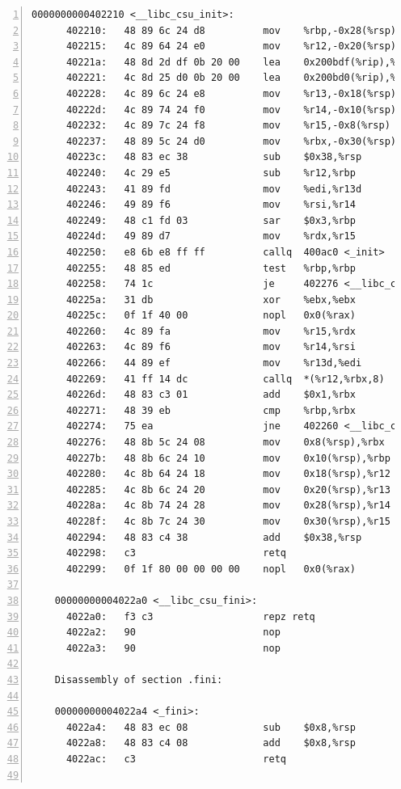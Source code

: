 \documentclass{article}
\begin{document}
\begin{lstlisting}[title = bomb的反汇编代码及部分注释, xleftmargin = 2em,xrightmargin = 2em, aboveskip = 1em, numbers = left, basicstyle=\scriptsize\ttfamily, numberstyle=\scriptsize]
    0000000000402210 <__libc_csu_init>:
      402210:	48 89 6c 24 d8       	mov    %rbp,-0x28(%rsp)
      402215:	4c 89 64 24 e0       	mov    %r12,-0x20(%rsp)
      40221a:	48 8d 2d df 0b 20 00 	lea    0x200bdf(%rip),%rbp        # 602e00 <__do_global_dtors_aux_fini_array_entry>
      402221:	4c 8d 25 d0 0b 20 00 	lea    0x200bd0(%rip),%r12        # 602df8 <__frame_dummy_init_array_entry>
      402228:	4c 89 6c 24 e8       	mov    %r13,-0x18(%rsp)
      40222d:	4c 89 74 24 f0       	mov    %r14,-0x10(%rsp)
      402232:	4c 89 7c 24 f8       	mov    %r15,-0x8(%rsp)
      402237:	48 89 5c 24 d0       	mov    %rbx,-0x30(%rsp)
      40223c:	48 83 ec 38          	sub    $0x38,%rsp
      402240:	4c 29 e5             	sub    %r12,%rbp
      402243:	41 89 fd             	mov    %edi,%r13d
      402246:	49 89 f6             	mov    %rsi,%r14
      402249:	48 c1 fd 03          	sar    $0x3,%rbp
      40224d:	49 89 d7             	mov    %rdx,%r15
      402250:	e8 6b e8 ff ff       	callq  400ac0 <_init>
      402255:	48 85 ed             	test   %rbp,%rbp
      402258:	74 1c                	je     402276 <__libc_csu_init+0x66>
      40225a:	31 db                	xor    %ebx,%ebx
      40225c:	0f 1f 40 00          	nopl   0x0(%rax)
      402260:	4c 89 fa             	mov    %r15,%rdx
      402263:	4c 89 f6             	mov    %r14,%rsi
      402266:	44 89 ef             	mov    %r13d,%edi
      402269:	41 ff 14 dc          	callq  *(%r12,%rbx,8)
      40226d:	48 83 c3 01          	add    $0x1,%rbx
      402271:	48 39 eb             	cmp    %rbp,%rbx
      402274:	75 ea                	jne    402260 <__libc_csu_init+0x50>
      402276:	48 8b 5c 24 08       	mov    0x8(%rsp),%rbx
      40227b:	48 8b 6c 24 10       	mov    0x10(%rsp),%rbp
      402280:	4c 8b 64 24 18       	mov    0x18(%rsp),%r12
      402285:	4c 8b 6c 24 20       	mov    0x20(%rsp),%r13
      40228a:	4c 8b 74 24 28       	mov    0x28(%rsp),%r14
      40228f:	4c 8b 7c 24 30       	mov    0x30(%rsp),%r15
      402294:	48 83 c4 38          	add    $0x38,%rsp
      402298:	c3                   	retq   
      402299:	0f 1f 80 00 00 00 00 	nopl   0x0(%rax)
    
    00000000004022a0 <__libc_csu_fini>:
      4022a0:	f3 c3                	repz retq 
      4022a2:	90                   	nop
      4022a3:	90                   	nop
    
    Disassembly of section .fini:
    
    00000000004022a4 <_fini>:
      4022a4:	48 83 ec 08          	sub    $0x8,%rsp
      4022a8:	48 83 c4 08          	add    $0x8,%rsp
      4022ac:	c3                   	retq   
    
      \end{lstlisting}

\normalsize
\end{document}
